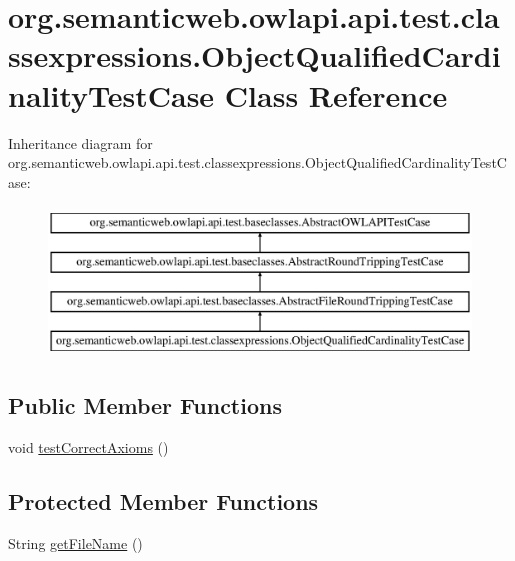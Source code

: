 \hypertarget{classorg_1_1semanticweb_1_1owlapi_1_1api_1_1test_1_1classexpressions_1_1_object_qualified_cardinality_test_case}{\section{org.\-semanticweb.\-owlapi.\-api.\-test.\-classexpressions.\-Object\-Qualified\-Cardinality\-Test\-Case Class Reference}
\label{classorg_1_1semanticweb_1_1owlapi_1_1api_1_1test_1_1classexpressions_1_1_object_qualified_cardinality_test_case}
}
Inheritance diagram for org.\-semanticweb.\-owlapi.\-api.\-test.\-classexpressions.\-Object\-Qualified\-Cardinality\-Test\-Case\-:\begin{figure}[H]
\begin{center}
\leavevmode
\includegraphics[height=4.000000cm]{classorg_1_1semanticweb_1_1owlapi_1_1api_1_1test_1_1classexpressions_1_1_object_qualified_cardinality_test_case}
\end{center}
\end{figure}
\subsection*{Public Member Functions}
\begin{DoxyCompactItemize}
\item 
void \hyperlink{classorg_1_1semanticweb_1_1owlapi_1_1api_1_1test_1_1classexpressions_1_1_object_qualified_cardinality_test_case_a305f54657ff211b9c6d3109b488d0efb}{test\-Correct\-Axioms} ()
\end{DoxyCompactItemize}
\subsection*{Protected Member Functions}
\begin{DoxyCompactItemize}
\item 
String \hyperlink{classorg_1_1semanticweb_1_1owlapi_1_1api_1_1test_1_1classexpressions_1_1_object_qualified_cardinality_test_case_a2ae5e3bc4465acfea859d3edd8a1b057}{get\-File\-Name} ()
\end{DoxyCompactItemize}


